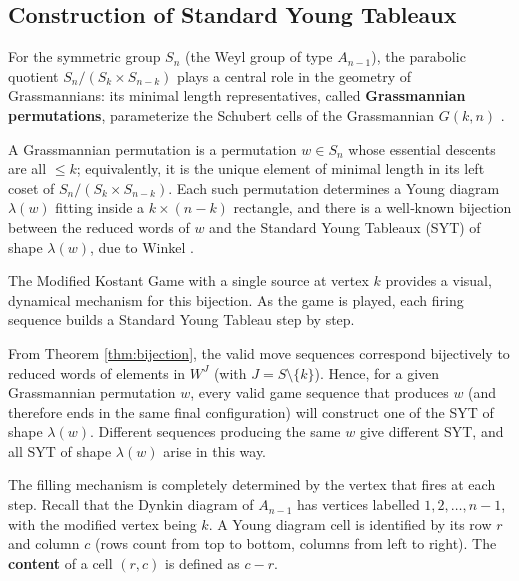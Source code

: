 \documentclass[11pt,a4paper]{amsart}
\theoremstyle{plain}
\theoremstyle{definition}
\theoremstyle{remark}
\begin{document}
\subsection{Construction of Standard Young Tableaux}

For the symmetric group $S_n$ (the Weyl group of type $A_{n-1}$), the parabolic quotient $S_n / (S_k \times S_{n-k})$ plays a central role in the geometry of Grassmannians: its minimal length representatives, called \textbf{Grassmannian permutations}, parameterize the Schubert cells of the Grassmannian $G(k,n)$ \cite{Winkel1996}. 

A Grassmannian permutation is a permutation $w \in S_n$ whose essential descents are all $\le k$; equivalently, it is the unique element of minimal length in its left coset of $S_n/(S_k \times S_{n-k})$. Each such permutation determines a Young diagram $\lambda(w)$ fitting inside a $k \times (n-k)$ rectangle, and there is a well‑known bijection between the reduced words of $w$ and the Standard Young Tableaux (SYT) of shape $\lambda(w)$, due to Winkel \cite{Winkel1996}.

The Modified Kostant Game with a single source at vertex $k$ provides a visual, dynamical mechanism for this bijection. As the game is played, each firing sequence builds a Standard Young Tableau step by step.

From Theorem \ref{thm:bijection}, the valid move sequences correspond bijectively to reduced words of elements in $W^J$ (with $J = S \setminus \{k\}$). Hence, for a given Grassmannian permutation $w$, every valid game sequence that produces $w$ (and therefore ends in the same final configuration) will construct one of the SYT of shape $\lambda(w)$. Different sequences producing the same $w$ give different SYT, and all SYT of shape $\lambda(w)$ arise in this way.

The filling mechanism is completely determined by the vertex that fires at each step. Recall that the Dynkin diagram of $A_{n-1}$ has vertices labelled $1,2,\dots,n-1$, with the modified vertex being $k$. A Young diagram cell is identified by its row $r$ and column $c$ (rows count from top to bottom, columns from left to right). The \textbf{content} of a cell $(r,c)$ is defined as $c - r$.
\end{document}
